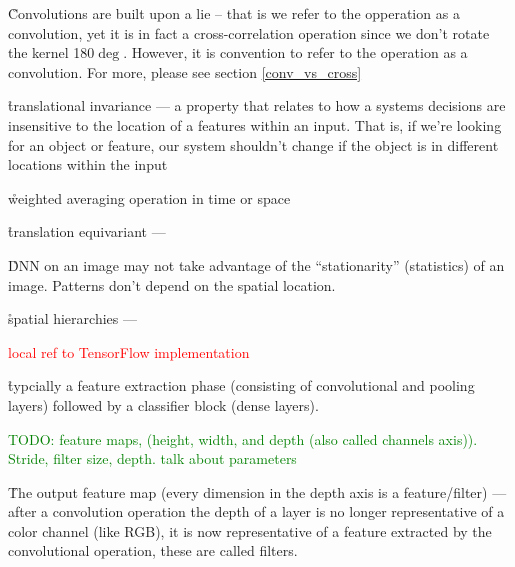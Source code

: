 

\r{Convolutions are built upon a lie -- that is we refer to the opperation as a convolution, yet it is in fact a cross-correlation operation since we don't rotate the kernel 180$\deg$. However, it is convention to refer to the operation as a convolution. For more, please see section \ref{conv_vs_cross}}

\r{translational invariance --- a property that relates to how a systems decisions are insensitive to the location of a features within an input. That is, if we're looking for an object or feature, our system shouldn't change if the object is in different locations within the input}






\r{weighted averaging operation in time or space}


\r{translation equivariant --- }

\r{DNN on an image may not take advantage of the ``stationarity'' (statistics) of an image. Patterns don't depend on the spatial location.}

\r{spatial hierarchies --- }

\textcolor{red}{local ref to TensorFlow implementation}

\r{typcially a feature extraction phase (consisting of convolutional and pooling layers) followed by a classifier block (dense layers).}

\textcolor{green}{TODO: feature maps, (height, width, and depth (also called channels axis)). Stride, filter size, depth. talk about parameters}

\r{The output feature map (every dimension in the depth axis is a feature/filter) --- after a convolution operation the depth of a layer is no longer representative of a color channel (like RGB), it is now representative of a feature extracted by the convolutional operation, these are called filters.}

